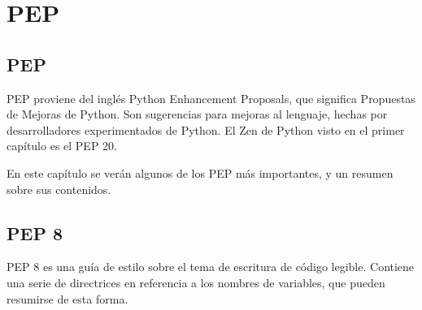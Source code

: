 \chapter{PEP}

\section{PEP}


PEP proviene del inglés Python Enhancement Proposals, que significa Propuestas de Mejoras de Python. Son sugerencias para mejoras al lenguaje, hechas por desarrolladores experimentados de Python. El Zen de Python visto en el primer capítulo es el PEP 20.



En este capítulo se verán algunos de los PEP más importantes, y un resumen sobre sus contenidos.

\section{PEP 8}

PEP 8 es una guía de estilo sobre el tema de escritura de código legible. Contiene una serie de directrices en referencia a los nombres de variables, que pueden resumirse de esta forma.

